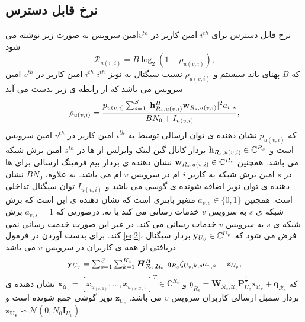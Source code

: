 \subsection{نرخ قابل دسترس}
نرخ قابل دسترس برای $i^{th}$ امین کاربر در $v^{th}$امین سرویس به صورت زیر نوشته می شود
\begin{equation}\label{eq1}
\mathcal{R}_{u(v,i)} = B \log_2({1+ \rho_{u(v,i)}}),
\end{equation}
  که $B$ پهنای باند سیستم و 
  $\rho_{u(v,i)}$
  نسبت سیگنال به نویز $i^{th}$
  $i^{th}$ 
  امین کاربر در
   $v^{th}$
   امین سرویس
  می باشد 
  که از رابطه ی زیر بدست می آید
 \begin{equation}\label{eq2}
\rho_{u(v,i)} =  \frac{p_{u(v,i)}\sum_{s=1}^{S}|\bold{h}_{R_s,u(v,i)}^H \bold{w}_{R_s,u(v,i)}|^2 a_{v,s}}{BN_0 + I_{u(v,i)}},
\end{equation}
که   $p_{u(v,i)}$
نشان دهنده ی توان ارسالی توسط  به 
$i^{th}$ 
  امین کاربر در
   $v^{th}$
   امین سرویس
   است و 
 $\bold{h}_{R_s,u(v,i)} \in \mathbb{C}^{{R}_s}$
 بردار کانال گین لینک وایرلس از  ها در 
$s^{th}$
امین برش شبکه می باشد.
 همچنین 
$\bold{w}_{R_s,u(v,i)} \in \mathbb{C}^{{R}_s}$
نشان دهنده ی بردار بیم فرمینگ ارسالی برای ها در $s$ امین برش شبکه به کاربر $i$ ام در سرویس $v$ ام می باشد.
   به علاوه، $BN_0$
   نشان دهنده ی توان نویز اضافه شونده ی گوسی می باشد و $I_{u(v,i)}$
   توان سیگنال تداخلی است.
همچنین $a_{v,s} \in \{0,1\}$
متغیر باینری است که نشان دهنده ی این است که برش شبکه ی $s$ به سرویس $v$ خدمات رسانی می کند یا نه.
درصورتی که 
 $a_{v,s} =1$
 برش شبکه ی $s$ به سرویس $v$ خدمات رسانی می کند. در غیر این صورت خدمت رسانی نمی کند.
\newline
برای بدست آوردن  در فرمول \eqref{eq2}، 
فرض می شود که 
 $\bold{y}_{U_v}\in \mathbb{C}^{U_v} $
 بردار سیگنال دریافتی از همه ی کاربران در سرویس $v$ می باشد 
\begin{equation}\label{eq3}
\textstyle \bold{y}_{U_v} = \sum_{s = 1}^{S}\sum_{k=1}^{K_s} \boldsymbol{H}^H_{\mathcal{R}_s,\mathcal{U}_v} \
\mathfrak{y}_{R_s}\zeta_{U_v,k,s} a_{v,s}+ \boldsymbol{z}_{\mathcal{U}_v},
\end{equation}
که $\mathfrak{y}_{R_s} = \boldsymbol{W}_{\mathcal{R}_s,\mathcal{U}_v}\boldsymbol{P}_{U_v}^{\frac{1}{2}}\boldsymbol{x}_{\mathcal{U}_v}+ \boldsymbol{q}_{\mathcal{R}_s}$
و 
$\boldsymbol{x}_{ \mathcal{U}_v} = [x_{ u_{(v,1)}},...,x_{ u_{(v,\mathcal{U}_v)}}]^T \in \mathbb{C}^{{R}_s } $
نشان دهنده ی بردار سمبل ارسالی کاربران سرویس $v$ می باشد.
$\boldsymbol{z}_{U_v}$
نویز گوشی جمع شونده است و
$\boldsymbol{z_{U_v}} \backsim \mathcal{N}(0,N_0\boldsymbol{I}_{{U}_v})$

